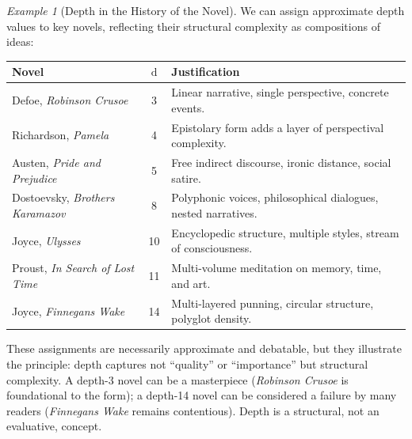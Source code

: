\documentclass[11pt,openany]{book}
\theoremstyle{definition}
\theoremstyle{plain}
\theoremstyle{remark}
\newtheorem{example}[axiom]{Example}
\newcommand{\depth}{\operatorname{d}}       %
\begin{document}
\begin{example}[Depth in the History of the Novel]
We can assign approximate depth values to key novels, reflecting their structural complexity as compositions of ideas:

\begin{center}
\begin{tabular}{lcp{8cm}}
\textbf{Novel} & \textbf{$\depth$} & \textbf{Justification} \\
\hline
Defoe, \emph{Robinson Crusoe} & 3 & Linear narrative, single perspective, concrete events. \\
Richardson, \emph{Pamela} & 4 & Epistolary form adds a layer of perspectival complexity. \\
Austen, \emph{Pride and Prejudice} & 5 & Free indirect discourse, ironic distance, social satire. \\
Dostoevsky, \emph{Brothers Karamazov} & 8 & Polyphonic voices, philosophical dialogues, nested narratives. \\
Joyce, \emph{Ulysses} & 10 & Encyclopedic structure, multiple styles, stream of consciousness. \\
Proust, \emph{In Search of Lost Time} & 11 & Multi-volume meditation on memory, time, and art. \\
Joyce, \emph{Finnegans Wake} & 14 & Multi-layered punning, circular structure, polyglot density.
\end{tabular}
\end{center}

These assignments are necessarily approximate and debatable, but they illustrate the principle: depth captures not ``quality'' or ``importance'' but structural complexity. A depth-3 novel can be a masterpiece (\emph{Robinson Crusoe} is foundational to the form); a depth-14 novel can be considered a failure by many readers (\emph{Finnegans Wake} remains contentious). Depth is a structural, not an evaluative, concept.
\end{example}
\end{document}
